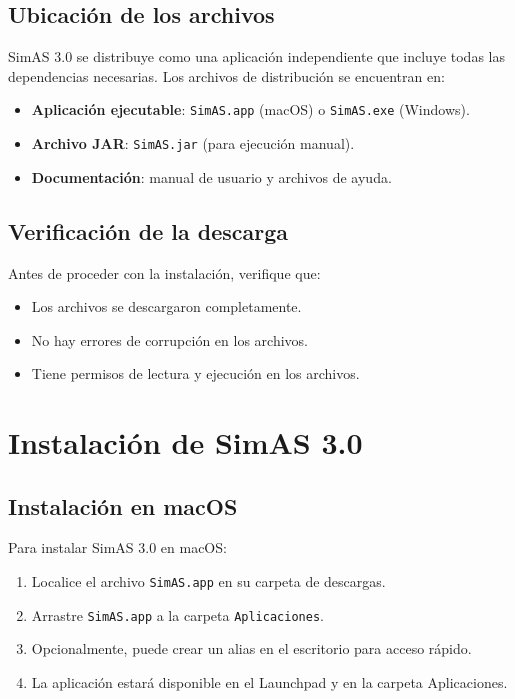 \subsection{Ubicación de los archivos}

SimAS 3.0 se distribuye como una aplicación independiente que incluye todas las dependencias necesarias. Los archivos de distribución se encuentran en:

\begin{itemize}
    \item \textbf{Aplicación ejecutable}: \texttt{SimAS.app} (macOS) o \texttt{SimAS.exe} (Windows).
    \item \textbf{Archivo JAR}: \texttt{SimAS.jar} (para ejecución manual).
    \item \textbf{Documentación}: manual de usuario y archivos de ayuda.
\end{itemize}

\subsection{Verificación de la descarga}

Antes de proceder con la instalación, verifique que:

\begin{itemize}
    \item Los archivos se descargaron completamente.
    \item No hay errores de corrupción en los archivos.
    \item Tiene permisos de lectura y ejecución en los archivos.
\end{itemize}

\section{Instalación de SimAS 3.0}

\subsection{Instalación en macOS}

Para instalar SimAS 3.0 en macOS:

\begin{enumerate}
    \item Localice el archivo \texttt{SimAS.app} en su carpeta de descargas.
    \item Arrastre \texttt{SimAS.app} a la carpeta \texttt{Aplicaciones}.
    \item Opcionalmente, puede crear un alias en el escritorio para acceso rápido.
    \item La aplicación estará disponible en el Launchpad y en la carpeta Aplicaciones.
\end{enumerate}

